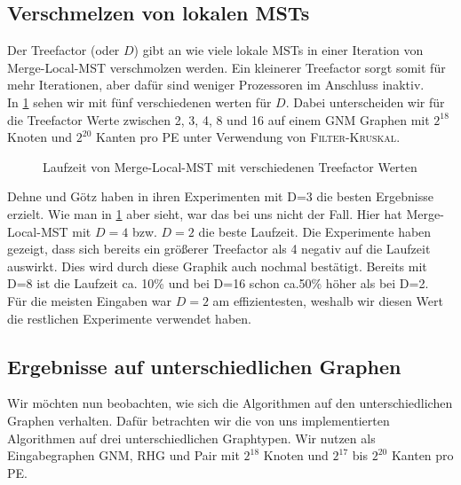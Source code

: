 \subsection{Verschmelzen von lokalen MSTs}\label{eval-treefactor}
Der Treefactor (oder $D$) gibt an wie viele lokale MSTs in einer Iteration von Merge-Local-MST verschmolzen werden. Ein kleinerer Treefactor sorgt somit für mehr Iterationen, aber dafür sind weniger Prozessoren im Anschluss inaktiv.\\
In \cref{Treefactor-Img} sehen wir \mergeMST mit fünf verschiedenen werten für $D$.
Dabei unterscheiden wir für die Treefactor Werte zwischen 2, 3, 4, 8 und 16 auf einem GNM Graphen mit $2^{18}$ Knoten und $2^{20}$ Kanten pro PE unter Verwendung von \textsc{Filter-Kruskal}.


\begin{figure}[H]
    \centering
    
    
    
    \caption{Laufzeit von Merge-Local-MST mit verschiedenen Treefactor Werten}
    \label{Treefactor-Img}
\end{figure}


Dehne und Götz \cite{dehne1998practical} haben in ihren Experimenten mit D=3 die besten Ergebnisse erzielt. 
Wie man in \cref{Treefactor-Img} aber sieht, war das bei uns nicht der Fall. Hier hat Merge-Local-MST mit $D=4$ bzw. $D=2$ die beste Laufzeit. 
Die Experimente haben gezeigt, dass sich bereits ein größerer Treefactor als 4 negativ auf die Laufzeit auswirkt. Dies wird durch diese Graphik auch nochmal bestätigt. Bereits mit D=8 ist die Laufzeit ca. 10\% und bei D=16 schon ca.50\% höher als bei D=2.\\
Für die meisten Eingaben war $D=2$ am effizientesten, weshalb wir diesen Wert die restlichen Experimente verwendet haben.



\subsection{Ergebnisse auf unterschiedlichen Graphen}
Wir möchten nun beobachten, wie sich die Algorithmen auf den unterschiedlichen Graphen verhalten.
Dafür betrachten wir die von uns implementierten Algorithmen auf drei unterschiedlichen Graphtypen. Wir nutzen als Eingabegraphen GNM, RHG und Pair mit $2^{18}$ Knoten und $2^{17}$ bis $2^{20}$ Kanten pro PE.


